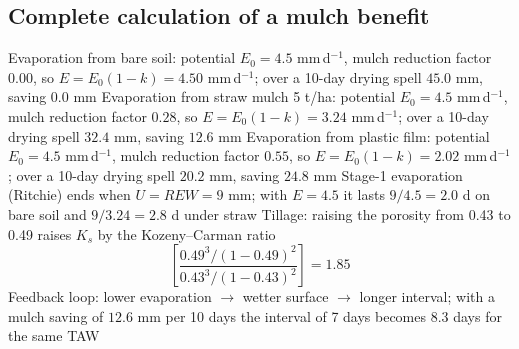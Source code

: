 \subsection{Complete calculation of a mulch benefit}
\sol
\ans Evaporation from bare soil: potential $E_0=4.5$ mm\,d$^{-1}$, mulch reduction factor $0.00$, so $E=E_0(1-k)=4.50$ mm\,d$^{-1}$; over a 10-day drying spell $45.0$ mm, saving $0.0$ mm
\ans Evaporation from straw mulch 5 t/ha: potential $E_0=4.5$ mm\,d$^{-1}$, mulch reduction factor $0.28$, so $E=E_0(1-k)=3.24$ mm\,d$^{-1}$; over a 10-day drying spell $32.4$ mm, saving $12.6$ mm
\ans Evaporation from plastic film: potential $E_0=4.5$ mm\,d$^{-1}$, mulch reduction factor $0.55$, so $E=E_0(1-k)=2.02$ mm\,d$^{-1}$; over a 10-day drying spell $20.2$ mm, saving $24.8$ mm
\ans Stage-1 evaporation (Ritchie) ends when $U=REW=9$ mm; with $E=4.5$ it lasts $9/4.5=2.0$ d on bare soil and $9/3.24=2.8$ d under straw
\ans Tillage: raising the porosity from 0.43 to 0.49 raises $K_s$ by the Kozeny--Carman ratio \[\left[\frac{0.49^3/(1-0.49)^2}{0.43^3/(1-0.43)^2}\right]=1.85\]
\ans Feedback loop: lower evaporation $\to$ wetter surface $\to$ longer interval; with a mulch saving of $12.6$ mm per 10 days the interval of 7 days becomes 8.3 days for the same TAW \finans


